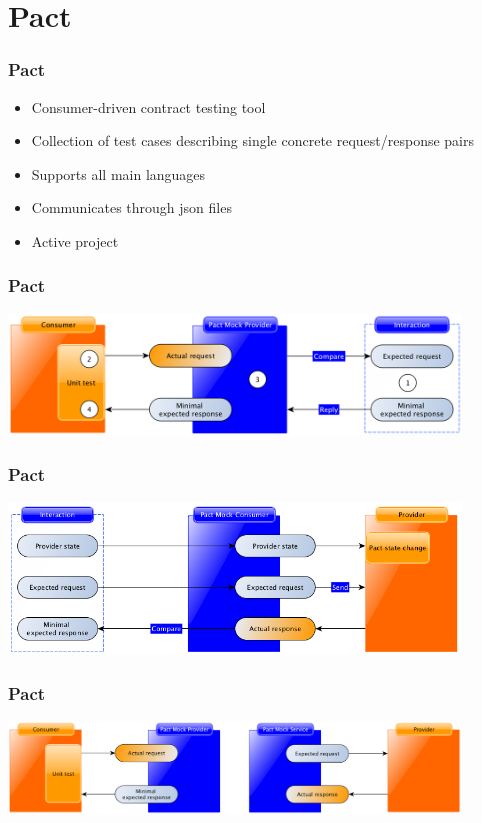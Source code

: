 \documentclass[aspectratio=169]{beamer}
\begin{document}
\section{Pact}
\begin{frame}
\frametitle{Pact}
\begin{itemize}
\item Consumer-driven contract testing tool
\item Collection of test cases describing single concrete request/response pairs
\item Supports all main languages
\item Communicates through json files
\item Active project
\end{itemize}
\end{frame}

\begin{frame}
\frametitle{Pact}
\center
\includegraphics[width=12cm]{./images/pact-overview-consumer.png}
\end{frame}
\begin{frame}
\frametitle{Pact}
\center
\includegraphics[width=12cm]{./images/pact-verification-states=provider.png}
\end{frame}
\begin{frame}
\frametitle{Pact}
\center
\includegraphics[width=12cm]{./images/pact-test-and-verify.png}
\end{frame}
\end{document}
